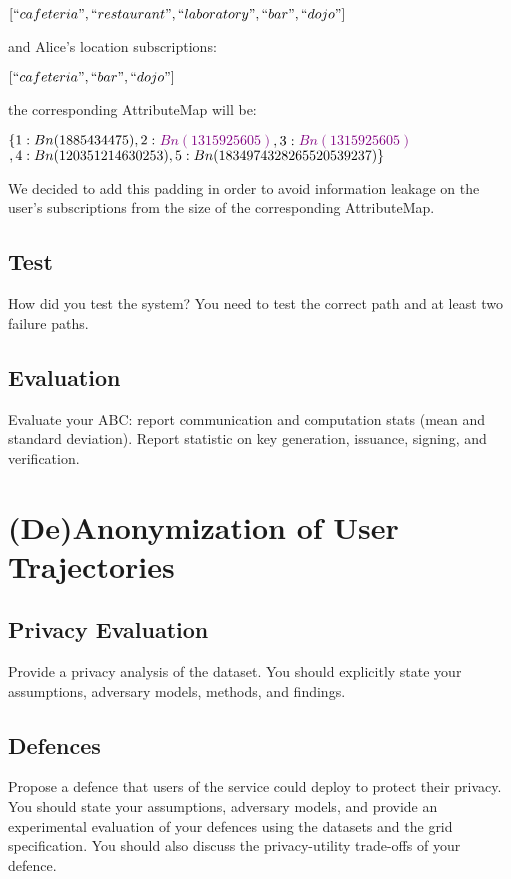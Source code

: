 \documentclass[10pt,conference,compsocconf]{IEEEtran}
\begin{document}
$[``cafeteria", ``restaurant", ``laboratory", ``bar", ``dojo"]$ 

\noindent
and Alice's location subscriptions:  

$[``cafeteria", ``bar", ``dojo"]$ 

\noindent
the corresponding AttributeMap will be:

\noindent
$\{1: Bn(1885434475), \\ 
2: $\textcolor{purple}{$\ Bn(1315925605)$}$, \\
3: $\textcolor{purple}{$\ Bn(1315925605)$}$, \\
4: Bn(120351214630253), \\
5: Bn(1834974328265520539237)\}$


We decided to add this padding in order to avoid information leakage on the user's subscriptions from the size of the corresponding AttributeMap. 

\subsection{Test}
How did you test the system?
You need to test the correct path and at least two failure paths.

\subsection{Evaluation}
Evaluate your ABC: report communication and computation stats (mean and standard
deviation). Report statistic on key generation, issuance, signing, and
verification.

\section{(De)Anonymization of User Trajectories}

\subsection{Privacy Evaluation}
Provide a privacy analysis of the dataset. You should explicitly state your assumptions, adversary
models, methods, and findings.

\subsection{Defences}
Propose a defence that users of the service could deploy to protect their privacy.  You
should state your assumptions, adversary models, and provide an experimental evaluation of your
defences using the datasets and the grid specification. You should also discuss the
privacy-utility trade-offs of your defence.
\end{document}
